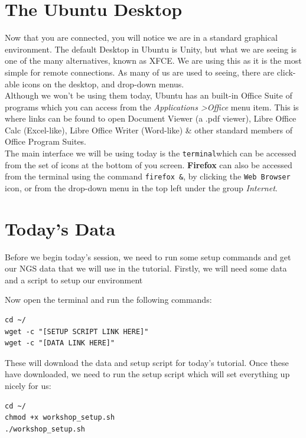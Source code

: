 \section{The Ubuntu Desktop}
\begin{note}
Now that you are connected, you will notice we are in a standard graphical environment.
The default Desktop in Ubuntu is Unity, but what we are seeing is one of the many alternatives, known as XFCE.
We are using this as it is the most simple for remote connections.
As many of us are used to seeing, there are click-able icons on the desktop, and drop-down menus. \\

Although we won't be using them today, Ubuntu has an built-in Office Suite of
programs which you can access from the \textit{Applications \textgreater Office} menu item.
This is where links can be found to open Document Viewer (a .pdf viewer), Libre Office Calc (Excel-like), Libre Office Writer (Word-like) \& other standard members of Office Program Suites. \\

The main interface we will be using today is the \texttt{terminal}which can be accessed from the set of icons at the bottom of you screen.
\textbf{Firefox} can also be accessed from the terminal using the command \texttt{firefox \&},  by clicking the \texttt{Web Browser} icon, or from the drop-down menu in the top left under the group \textit{Internet}.

\end{note}

\section{Today's Data}
\begin{note}
Before we begin today's session, we need to run some setup commands and get our NGS data that we will use in the tutorial. Firstly, we will need some data and a script to setup our environment
\end{note}

\begin{steps}
Now open the terminal and run the following commands:
\begin{lstlisting}
cd ~/
wget -c "[SETUP SCRIPT LINK HERE]"
wget -c "[DATA LINK HERE]"
\end{lstlisting}

These will download the data and setup script for today's tutorial. Once these have downloaded, we need to run the setup script which will set everything up nicely for us:

\begin{lstlisting}
cd ~/
chmod +x workshop_setup.sh
./workshop_setup.sh
\end{lstlisting}

\end{steps}
